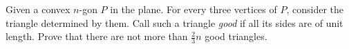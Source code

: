 Given a convex $n$-gon $P$ in the plane. For every three vertices of $P$, consider the triangle determined by them. Call such a triangle \emph{good} if all its sides are of unit length. Prove that there are not more than $\frac{2}{3}n$ good triangles.
